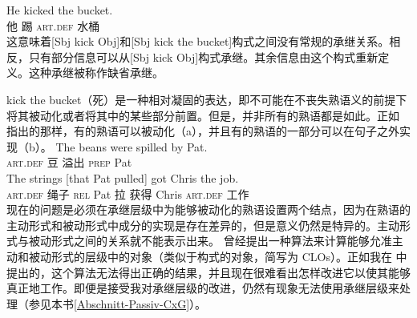\begin{exe}
\begin{xlist}[iv.]
\begin{exe}
\begin{xlist}[iv.]
\ea
\gll He kicked the bucket.\\
     他 踢 \textsc{art}.\textsc{def} 水桶\\
\z
这意味着[Sbj kick Obj]和[Sbj kick the bucket]构式之间没有常规的承继关系。相反，只有部分信息可以从[Sbj kick Obj]构式承继。其余信息由这个构式重新定义。这种承继被称作缺省承继。

kick the bucket（死）是一种相对凝固的表达，即不可能在不丧失熟语义的前提下将其被动化或者将其中的某些部分前置\citep*[]{NSW94a}。但是，并非所有的熟语都是如此。正如 \citet*[]{NSW94a}指出的那样，有的熟语可以被动化（a），并且有的熟语的一部分可以在句子之外实现（b）。
\eal
\ex 
\gll The beans were spilled by Pat.\\
     \textsc{art}.\textsc{def} 豆 \passivepst{} 溢出 \textsc{prep} Pat\\
\ex 
\gll The strings [that Pat pulled] got Chris the job.\\
     \textsc{art}.\textsc{def} 绳子 \spacebr{}\textsc{rel} Pat 拉 获得 Chris \textsc{art}.\textsc{def} 工作\\
\zl
%
%
现在的问题是必须在承继层级中为能够被动化的熟语设置两个结点，因为在熟语的主动形式和被动形式中成分的实现是存在差异的，但是意义仍然是特异的。主动形式与被动形式之间的关系就不能表示出来。 \citet{Kay2002a}曾经提出一种算法来计算能够允准主动和被动形式的层级中的对象（类似于构式的对象，简写为 CLOs）。正如我在 \citet[\S~3]{Mueller2006d}中提出的，这个算法无法得出正确的结果，并且现在很难看出怎样改进它以使其能够真正地工作。即便是接受我对承继层级的改进，仍然有现象无法使用承继层级来处理（参见本书\ref{Abschnitt-Passiv-CxG}）。

\end{xlist}
\end{exe}
\end{xlist}
\end{exe}
